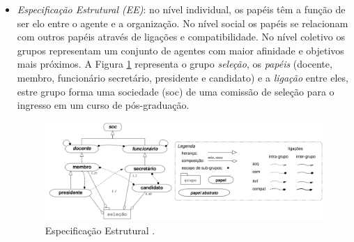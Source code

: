 \begin{itemize}

\item {\it Especificação Estrutural (EE)}: no nível individual, os papéis têm a função de ser elo entre o agente e a organização. No nível social os papéis se relacionam com outros papéis através de ligações e compatibilidade. No nível coletivo os grupos representam um conjunto de agentes com maior afinidade e objetivos mais próximos. A Figura \ref{fig:ee_exemplo} representa o grupo \textit{seleção}, os \textit{papéis} (docente, membro, funcionário secretário, presidente e candidato) e a \textit{ligação} entre eles, estre grupo forma uma sociedade (soc) de uma comissão de seleção para o ingresso em um curso de pós-graduação.

\begin{figure}[ht]
\centering
\includegraphics[scale=0.35]{imagens/modelo3.png}
\caption{Especificação Estrutural \cite{hubner2003modelo}.}
\label{fig:ee_exemplo}
\end{figure}



\end{itemize}
